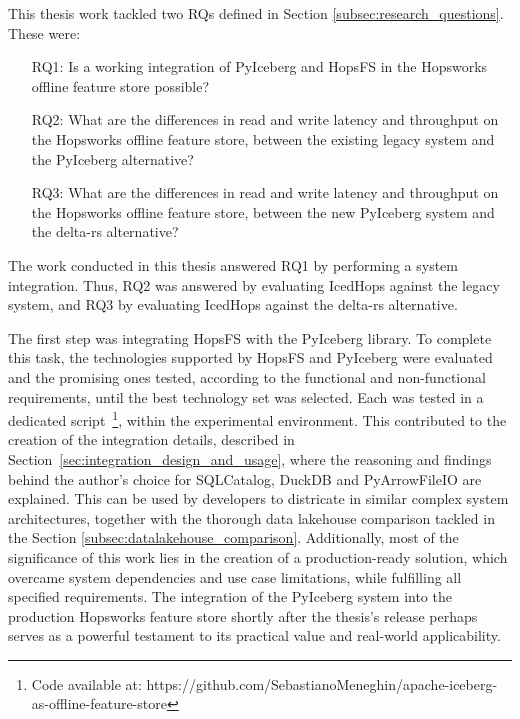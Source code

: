 This thesis work tackled two \glspl{RQ} defined in Section \ref{subsec:research_questions}. These were: 
\begin{enumerate}
    \item[RQ1:] Is a working integration of PyIceberg and HopsFS in the Hopsworks offline feature store possible?
    \item[RQ2:] What are the differences in read and write latency and throughput on the Hopsworks offline feature store, between the existing legacy system and the PyIceberg alternative?
    \item[RQ3:] What are the differences in read and write latency and throughput on the Hopsworks offline feature store, between the new PyIceberg system and the delta-rs alternative?
\end{enumerate}
The work conducted in this thesis answered \gls{RQ}1 by performing a system integration. Thus, \gls{RQ}2 was answered by evaluating IcedHops against the legacy system, and \gls{RQ}3 by evaluating IcedHops against the delta-rs alternative.

The first step was integrating \gls{HopsFS} with the PyIceberg library. To complete this task, the technologies supported by \gls{HopsFS} and PyIceberg were evaluated and the promising ones tested, according to the functional and non-functional requirements, until the best technology set was selected. Each was tested in a dedicated script~\footnote{Code available at: https://github.com/SebastianoMeneghin/apache-iceberg-as-offline-feature-store}, within the experimental environment. This contributed to the creation of the integration details, described in Section~\ref{sec:integration_design_and_usage}, where the reasoning and findings behind the author's choice for SQLCatalog, DuckDB and PyArrowFileIO are explained. This can be used by developers to districate in similar complex system architectures, together with the thorough data lakehouse comparison tackled in the Section \ref{subsec:datalakehouse_comparison}. Additionally, most of the significance of this work lies in the creation of a production-ready solution, which overcame system dependencies and use case limitations, while fulfilling all specified requirements. The integration of the PyIceberg system into the production Hopsworks feature store shortly after the thesis's release perhaps serves as a powerful testament to its practical value and real-world applicability.


